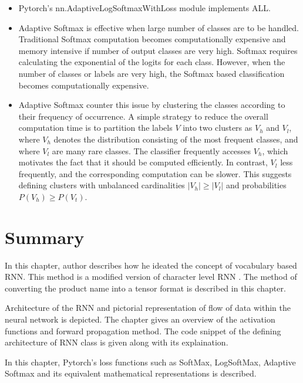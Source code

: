 \begin{itemize}
    \item Pytorch's \parencite{Paszke.03122019} nn.AdaptiveLogSoftmaxWithLoss module implements \acf{ALL}.
    \item Adaptive Softmax \parencite{Grave.14092016} is effective when large number of classes are to be handled. Traditional Softmax computation becomes computationally expensive and memory intensive if number of output classes are very high. Softmax requires calculating the exponential of the logits for each class. However, when the number of classes or labels are very high, the Softmax based classification becomes computationally expensive.
    \item Adaptive Softmax counter this issue by clustering the classes according to their frequency of occurrence. A simple strategy to reduce the overall computation time is to partition the labels \(V\) into two clusters as \(V_h\) and \(V_l\), where \(V_h\) denotes the distribution consisting of the most frequent classes, and where \(V_l\) are many rare classes. The classifier frequently accesses \(V_h\), which motivates the fact that it should be computed efficiently. In contrast,  \(V_l\) less frequently, and the corresponding computation can be slower. This suggests defining clusters with unbalanced cardinalities \(|V_h| \geq |V_l|\) and probabilities \(P(V_h) \geq P(V_t)\).
\end{itemize}










\section{Summary}

In this chapter, author describes how he ideated the concept of vocabulary based RNN. This method is a modified version of character level RNN \parencite{sean}. The method of converting the product name into a tensor format is described in this chapter. 

Architecture of the RNN and pictorial representation of flow of data within the neural network is depicted. The chapter gives an overview of the activation functions and forward propagation method. The code snippet of the defining architecture of \acl{RNN} class is given along with its explaination.  

In this chapter, Pytorch's loss functions such as  SoftMax, LogSoftMax, Adaptive Softmax and its equivalent mathematical  representations is described. 